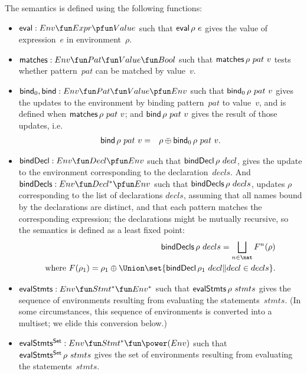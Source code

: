 The semantics is defined using the following functions:
%
\begin{itemize}
\item $\eval : Env \fun Expr \pfun Value$ such that $\mathop{\sf eval} \rho~e$ gives the
  value of expression~$e$ in environment~$\rho$.

\item $\matches : Env \fun Pat \fun Value \fun Bool$ such that
  $\mathop{\sf matches} \rho~pat ~ v$ tests whether pattern~$pat$ can be matched by
  value~$v$.

\item $\bind_0, \bind : Env \fun Pat \fun Value \pfun Env$ such that
  $\mathop{\sf bind}\nolimits_0 \rho~pat~v$ gives the updates to the environment by binding
  pattern~$pat$ to value~$v$, and is defined when $\mathop{\sf matches} \rho~ pat~v$; and 
  $\mathop{\sf bind}\nolimits \rho~pat~v$ gives the result of those updates, i.e.
  \begin{eqnarray*}
  \mathop{\sf bind}\nolimits \rho~pat~v & = & \rho \oplus \mathop{\sf bind}\nolimits_0 \rho~pat~v.
  \end{eqnarray*}

\item $\bindDecl : Env \fun Decl \pfun Env$ such that $\mathop{\sf bindDecl} \rho~decl$,
  gives the update to the environment corresponding to the
  declaration~$decls$.  And $\bindDecls : Env \fun Decl^* \pfun Env$ such that
  $\mathop{\sf bindDecls} \rho~decls$, updates $\rho$ corresponding to the list of
  declarations $decls$, assuming that all names bound by the declarations are
  distinct, and that each pattern matches the corresponding expression; the
  declarations might be mutually recursive, so the semantics is defined as a
  least fixed point:
  \[
  \begin{align}
  \bindDecls \rho~decls = \bigsqcup_{n \in \nat} F^n(\rho) \\
  \mbox{where } F(\rho_1)  =  
    \rho_1 \oplus \Union \set{\bindDecl \rho_1 ~ decl \| decl \in decls}.
  \end{align}
  \]

\item $\evalStmts : Env \fun Stmt^* \fun Env^*$ such that $\mathop{\sf evalStmts}
  \rho~stmts$ gives the sequence of environments resulting from evaluating the
  statements~$stmts$.  (In some circumstances, this sequence of environments
  is converted into a multiset; we elide this conversion below.)

\item $\evalStmtsSet : Env \fun Stmt^* \fun \power(Env)$ such that
  $\mathop{\sf evalStmts^{Set}} \rho~stmts$ gives the set of environments resulting from
  evaluating the statements~$stmts$.
\end{itemize}

